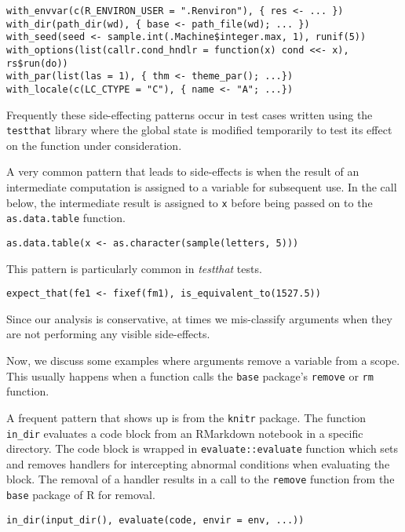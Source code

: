 \documentclass[review,nonacm,screen,acmsmall,anonymous=true]{acmart}
\newcommand{\code}[1]{\lstinline |#1|\xspace}
\begin{document}
\begin{lstlisting}
with_envvar(c(R_ENVIRON_USER = ".Renviron"), { res <- ... })
with_dir(path_dir(wd), { base <- path_file(wd); ... })
with_seed(seed <- sample.int(.Machine$integer.max, 1), runif(5))
with_options(list(callr.cond_hndlr = function(x) cond <<- x), rs$run(do))
with_par(list(las = 1), { thm <- theme_par(); ...})
with_locale(c(LC_CTYPE = "C"), { name <- "A"; ...})
\end{lstlisting}

Frequently these side-effecting patterns occur in test cases written using the
\code{testthat} library where the global state is modified temporarily to test
its effect on the function under consideration.

A very common pattern that leads to side-effects is when the result of an
intermediate computation is assigned to a variable for subsequent use. In the
call below, the intermediate result is assigned to \code{x} before being passed
on to the \code{as.data.table} function.

\begin{lstlisting}
as.data.table(x <- as.character(sample(letters, 5)))
\end{lstlisting}

This pattern is particularly common in \emph{testthat} tests.

\begin{lstlisting}
expect_that(fe1 <- fixef(fm1), is_equivalent_to(1527.5))
\end{lstlisting}

Since our analysis is conservative, at times we mis-classify arguments when they
are not performing any visible side-effects.


Now, we discuss some examples where arguments remove a variable from a scope.
This usually happens when a function calls the \code{base} package's
\code{remove} or \code{rm} function.

A frequent pattern that shows up is from the \code{knitr} package. The function
\code{in_dir} evaluates a code block from an RMarkdown notebook in a specific
directory. The code block is wrapped in \code{evaluate::evaluate} function which
sets and removes handlers for intercepting abnormal conditions when evaluating
the block. The removal of a handler results in a call to the \code{remove}
function from the \code{base} package of R for removal.

\begin{lstlisting}
in_dir(input_dir(), evaluate(code, envir = env, ...))
\end{lstlisting}
\end{document}
